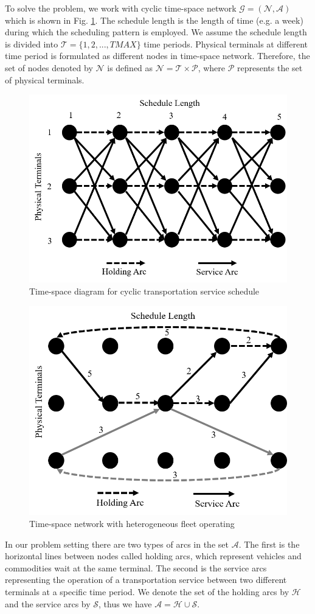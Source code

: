 \documentclass[11pt,nonblindrev,fleqn]{article}
\begin{document}
To solve the problem, we work with cyclic time-space network $\mathscr{G}=(\mathscr{N},\mathscr{A})$ which is shown in Fig. \ref{Fig1}. The schedule length is the length of time (e.g. a week) during which the scheduling pattern is employed. We assume the schedule length is divided into $\mathscr{T}=\{1,2,...,TMAX\}$ time periods. Physical terminals at different time period is formulated as different nodes in time-space network. Therefore, the set of nodes denoted by $\mathscr{N}$ is defined as $\mathscr{N}=\mathscr{T}\times \mathscr{P}$, where $\mathscr{P}$ represents the set of physical terminals.
\begin{figure}[H]
\setlength{\abovecaptionskip}{-5pt}
\setlength{\belowcaptionskip}{-5pt}
\centering
\includegraphics[width=0.5\linewidth]{F1.png}
\caption{\small Time-space diagram for cyclic transportation service schedule}
\label{Fig1}
\end{figure}

\begin{figure}[H]
\setlength{\abovecaptionskip}{-5pt}
\setlength{\belowcaptionskip}{-5pt}
\centering
\includegraphics[width=0.5\linewidth]{F2.png}
\caption{\small Time-space network with heterogeneous fleet operating}
\label{Fig2}
\end{figure}

In our problem setting there are two types of arcs in the set $\mathscr{A}$. The first is the horizontal lines between nodes called holding arcs, which represent vehicles and commodities wait at the same terminal. The second is the service arcs representing the operation of a transportation service between two different terminals at a specific time period. We denote the set of the holding arcs by $\mathscr{H}$ and the service arcs by $\mathscr{S}$, thus we have $\mathscr{A}=\mathscr{H}\cup \mathscr{S}$.
\end{document}
